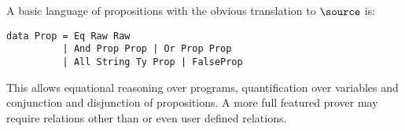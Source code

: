 A basic language of propositions with the obvious translation to
$\source$ is:

\begin{verbatim}
data Prop = Eq Raw Raw
          | And Prop Prop | Or Prop Prop
          | All String Ty Prop | FalseProp
\end{verbatim}

This allows equational reasoning over \Funl{} programs, quantification
over variables and conjunction and disjunction of propositions. A more
full featured prover may require relations other than  or
even user defined relations.